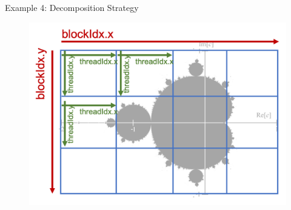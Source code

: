 \documentclass{beamer}
\begin{document}
    \begin{frame}{Example 4: Decomposition Strategy}
        \begin{figure}
            \centering
            \includegraphics[width=\textwidth]{img/03/mandelbrot.png}
        \end{figure}

    \end{frame}
\end{document}
